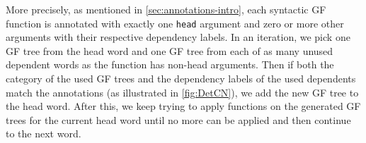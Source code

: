 More precisely, as mentioned in \autoref{sec:annotations-intro}, each syntactic GF function is annotated with exactly one \texttt{head} argument and zero or more other arguments with their respective dependency labels. In an iteration, we pick one GF tree from the head word and one GF tree from each of as many unused dependent words as the function has non-head arguments. Then if both the category of the used GF trees and the dependency labels of the used dependents match the annotations (as illustrated in \autoref{fig:DetCN}), we add the new GF tree to the head word.
After this, we keep trying to apply functions on the generated GF trees for the current head word until no more can be applied and then continue to the next word.






%
%

